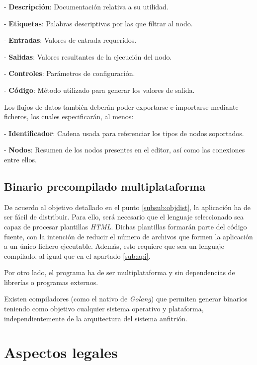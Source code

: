 - \textbf{Descripción}: Documentación relativa a su utilidad.

- \textbf{Etiquetas}: Palabras descriptivas por las que filtrar al nodo.

- \textbf{Entradas}: Valores de entrada requeridos.

- \textbf{Salidas}: Valores resultantes de la ejecución del nodo.

- \textbf{Controles}: Parámetros de configuración.

- \textbf{Código}: Método utilizado para generar los valores de salida.\sn

Los flujos de datos también deberán poder exportarse e importarse mediante ficheros, los cuales especificarán, al menos:\sn

- \textbf{Identificador}: Cadena usada para referenciar los tipos de nodos soportados.

- \textbf{Nodos}: Resumen de los nodos presentes en el editor, así como las conexiones entre ellos.\n

\subsection{Binario precompilado multiplataforma} \label{sub:binary}

De acuerdo al objetivo detallado en el punto \ref{subsub:objdist}, la aplicación ha de ser fácil de distribuir. Para ello, será necesario que el lenguaje seleccionado sea capaz de procesar plantillas \textit{HTML}. Dichas plantillas formarán parte del código fuente, con la intención de reducir el número de archivos que formen la aplicación a un único fichero ejecutable. Además, esto requiere que sea un lenguaje compilado, al igual que en el apartado \ref{sub:api}.\sn

Por otro lado, el programa ha de ser multiplataforma y sin dependencias de librerías o programas externos.\sn

Existen compiladores (como el nativo de \textit{Golang}) que permiten generar binarios teniendo como objetivo cualquier sistema operativo y plataforma, independientemente de la arquitectura del sistema anfitrión.\n


\section{Aspectos legales} \label{sec:legal}

